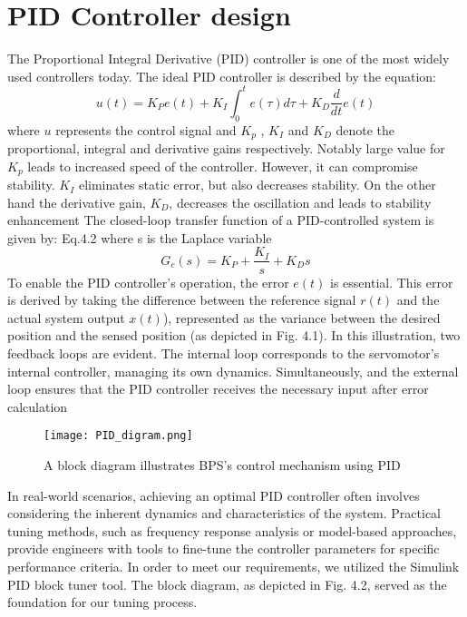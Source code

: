 \section{PID Controller design}
The Proportional Integral Derivative (PID) controller is one of the most widely used controllers today. The ideal PID controller is described by the equation:
\begin{equation}
u(t) = K_P e(t) + K_I \int_0^t e(\tau) d\tau + K_D \frac{d}{dt} e(t)
\end{equation}
where \(u\) represents the control signal and \(K_p\) , \(K_I\) and \(K_D\) denote the proportional, integral and derivative gains respectively. Notably large value for \(K_p\) leads to increased speed of the controller. However, it can compromise stability. \(K_I\) 
eliminates static error, but also decreases stability. On the other hand the derivative gain, \(K_D\), decreases the oscillation and leads to stability enhancement 
The closed-loop transfer function of a PID-controlled system is given by: Eq.4.2 where s is the Laplace variable
\begin{equation}
G_c(s) = K_P + \frac{K_I}{s} + K_Ds 
\end{equation}
To enable the PID controller's operation, the error \(e(t)\) is essential. This error is derived by taking the difference between the reference signal \(r(t)\) and the actual system output \(x(t)\)), represented as the variance between the desired position  and the sensed position (as depicted in Fig. 4.1). In this illustration, two feedback loops are evident. The internal loop corresponds to the servomotor's internal controller, managing its own dynamics. Simultaneously,  and the external loop ensures that the PID controller receives the necessary input after error calculation
\begin{figure}[h]
    \centering
    \texttt{[image: PID\_digram.png]}
    \caption{A block diagram illustrates BPS's control mechanism using PID}
    
\end{figure}

In real-world scenarios, achieving an optimal PID controller often involves considering the inherent dynamics and characteristics of the system. Practical tuning methods, such as frequency response analysis or model-based approaches, provide engineers with tools to fine-tune the controller parameters for specific performance criteria. In order to meet our requirements, we utilized the Simulink PID block tuner tool. The block diagram, as depicted in Fig. 4.2, served as the foundation for our tuning process.

